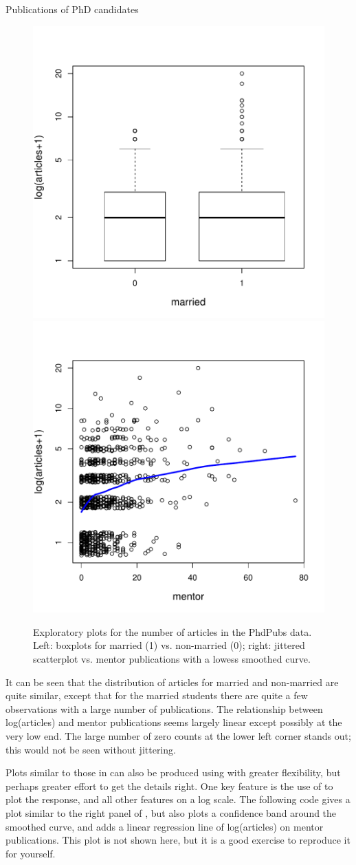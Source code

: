 \documentclass[11pt]{book}\usepackage[]{graphicx}\usepackage[]{color}
\newenvironment{knitrout}{}{} %
\renewenvironment{knitrout}{\small\renewcommand{\baselinestretch}{.85}}{} %
\begin{document}
\begin{Example}[phdpubs1]{Publications of PhD candidates}
\begin{knitrout}
\begin{figure}[!htbp]
\centerline{\includegraphics[width=.49\textwidth]{ch09/fig/phdpubs-logplots-1} 
\includegraphics[width=.49\textwidth]{ch09/fig/phdpubs-logplots-2} }

\caption[Exploratory plots for the number of articles in the PhdPubs data]{Exploratory plots for the number of articles in the PhdPubs data. Left: boxplots for married (1) vs. non-married (0); right: jittered scatterplot vs. mentor publications with a lowess smoothed curve.\label{fig:phdpubs-logplots}}
\end{figure}


\end{knitrout}
It can be seen that the distribution of articles for married and non-married are quite similar,
except that for the married students there are quite a few observations with a large number
of publications.  The relationship between log(articles) and mentor publications seems largely
linear except possibly at the very low end.  The large number of zero counts at the lower left
corner stands out; this would not be seen without jittering.

Plots similar to those in  can also be produced using 
with greater flexibility, but perhaps greater effort to get the details right.
One key feature is the use of  to plot the response, and all other
features on a log scale.
The following code gives a plot similar to the right panel of
, but also plots a confidence band around the smoothed curve,
and adds a linear regression line of log(articles) on mentor publications.  This plot
is not shown here, but it is a good exercise to reproduce it for yourself.


\end{Example}
\end{document}
